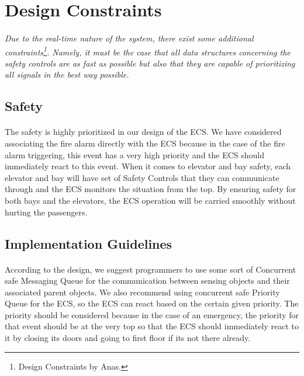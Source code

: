 \documentclass[12pt]{article}
\begin{document}
    
    
    
\section{Design Constraints} \label{cons}
\paragraph{} \textit{Due to the real-time nature of the system, there exist some additional 
constraints\footnote{Design Constraints by Anas.}. Namely, it must be the case that all data 
structures concerning the safety controls are as fast as possible but also that they are capable 
of prioritizing all signals in the best way possible.}

    \subsection{Safety}
    \paragraph{} The safety is highly prioritized in our design of the ECS. We have 
    considered associating the fire alarm directly with the ECS because in the case 
    of the fire alarm triggering, this event has a very high priority and the ECS 
    should immediately react to this event. When it comes to elevator and bay safety, 
    each elevator and bay will have set of Safety Controls that they can communicate 
    through and the ECS monitors the situation from the top. By ensuring safety for 
    both bays and the elevators, the ECS operation will be carried smoothly without 
    hurting the passengers.

    \subsection{Implementation Guidelines}
    \paragraph{} According to the design, we suggest programmers to use some sort of 
    Concurrent safe Messaging Queue for the communication between sensing objects and 
    their associated parent objects. We also recommend using concurrent safe Priority 
    Queue for the ECS, so the ECS can react based on the certain given priority. The 
    priority should be considered because in the case of an emergency, the priority 
    for that event should be at the very top so that the ECS should immediately react 
    to it by closing its doors and going to first floor if its not there already.
\end{document}
